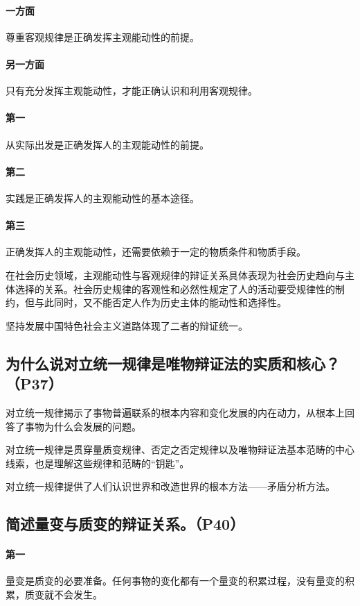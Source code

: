 \documentclass[UTF8]{ctexart}
\begin{document}
			\paragraph{一方面}
				尊重客观规律是正确发挥主观能动性的前提。\par
			\paragraph{另一方面}
				只有充分发挥主观能动性，才能正确认识和利用客观规律。\par
			\paragraph{第一}
				从实际出发是正确发挥人的主观能动性的前提。\par
			\paragraph{第二}
				实践是正确发挥人的主观能动性的基本途径。\par
			\paragraph{第三}
				正确发挥人的主观能动性，还需要依赖于一定的物质条件和物质手段。\par
			在社会历史领域，主观能动性与客观规律的辩证关系具体表现为社会历史趋向与主体选择的关系。社会历史规律的客观性和必然性规定了人的活动要受规律性的制约，但与此同时，又不能否定人作为历史主体的能动性和选择性。\par
			坚持发展中国特色社会主义道路体现了二者的辩证统一。
		\subsection{为什么说对立统一规律是唯物辩证法的实质和核心？（P37）}
			对立统一规律揭示了事物普遍联系的根本内容和变化发展的内在动力，从根本上回答了事物为什么会发展的问题。\par
			对立统一规律是贯穿量质变规律、否定之否定规律以及唯物辩证法基本范畴的中心线索，也是理解这些规律和范畴的“钥匙”。\par
			对立统一规律提供了人们认识世界和改造世界的根本方法——矛盾分析方法。
		\subsection{简述量变与质变的辩证关系。（P40）}
			\paragraph{第一}
				量变是质变的必要准备。任何事物的变化都有一个量变的积累过程，没有量变的积累，质变就不会发生。\par
\end{document}
